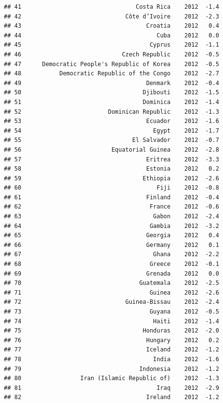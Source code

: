 \documentclass[
]{book}
\begin{document}
\begin{verbatim}
## 41                                 Costa Rica    2012  -1.4
## 42                              Côte d’Ivoire    2012  -2.3
## 43                                    Croatia    2012   0.4
## 44                                       Cuba    2012   0.0
## 45                                     Cyprus    2012  -1.1
## 46                             Czech Republic    2012  -0.5
## 47      Democratic People's Republic of Korea    2012  -0.5
## 48           Democratic Republic of the Congo    2012  -2.7
## 49                                    Denmark    2012  -0.4
## 50                                   Djibouti    2012  -1.5
## 51                                   Dominica    2012  -1.4
## 52                         Dominican Republic    2012  -1.3
## 53                                    Ecuador    2012  -1.6
## 54                                      Egypt    2012  -1.7
## 55                                El Salvador    2012  -0.7
## 56                          Equatorial Guinea    2012  -2.8
## 57                                    Eritrea    2012  -3.3
## 58                                    Estonia    2012   0.2
## 59                                   Ethiopia    2012  -2.6
## 60                                       Fiji    2012  -0.8
## 61                                    Finland    2012  -0.4
## 62                                     France    2012  -0.6
## 63                                      Gabon    2012  -2.4
## 64                                     Gambia    2012  -3.2
## 65                                    Georgia    2012   0.4
## 66                                    Germany    2012   0.1
## 67                                      Ghana    2012  -2.2
## 68                                     Greece    2012  -0.1
## 69                                    Grenada    2012   0.0
## 70                                  Guatemala    2012  -2.5
## 71                                     Guinea    2012  -2.6
## 72                              Guinea-Bissau    2012  -2.4
## 73                                     Guyana    2012  -0.5
## 74                                      Haiti    2012  -1.4
## 75                                   Honduras    2012  -2.0
## 76                                    Hungary    2012   0.2
## 77                                    Iceland    2012  -1.2
## 78                                      India    2012  -1.6
## 79                                  Indonesia    2012  -1.2
## 80                 Iran (Islamic Republic of)    2012  -1.3
## 81                                       Iraq    2012  -2.9
## 82                                    Ireland    2012  -1.2

\end{verbatim}
\end{document}
